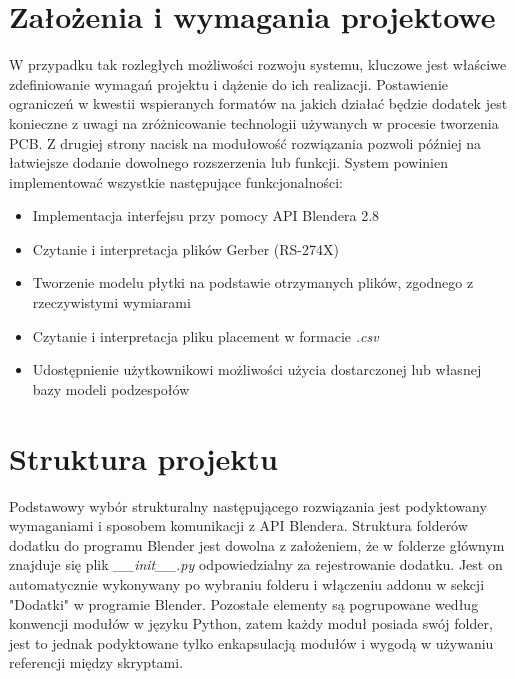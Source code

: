 \documentclass{xmgr}
\begin{document}
\section{Założenia i wymagania projektowe}
W przypadku tak rozległych możliwości rozwoju systemu, kluczowe jest właściwe zdefiniowanie wymagań projektu i dążenie do ich realizacji. Postawienie ograniczeń w kwestii wspieranych formatów na jakich działać będzie dodatek jest konieczne z uwagi na zróżnicowanie technologii używanych w procesie tworzenia PCB. Z drugiej strony nacisk na modułowość rozwiązania pozwoli później na łatwiejsze dodanie dowolnego rozszerzenia lub funkcji.
System powinien implementować wszystkie następujące funkcjonalności:

\begin{itemize}

\item Implementacja interfejsu przy pomocy API Blendera 2.8

\item Czytanie i interpretacja plików Gerber (RS-274X)

\item Tworzenie modelu płytki na podstawie otrzymanych plików, zgodnego z rzeczywistymi wymiarami

\item Czytanie i interpretacja pliku placement w formacie \emph{.csv}

\item Udostępnienie użytkownikowi możliwości użycia dostarczonej lub własnej bazy modeli podzespołów

\end{itemize}

\section {Struktura projektu}
Podstawowy wybór strukturalny następującego rozwiązania jest podyktowany wymaganiami i sposobem komunikacji z API Blendera. Struktura folderów dodatku do programu Blender jest dowolna z założeniem, że w folderze głównym znajduje się plik \emph{\_\_init\_\_.py} odpowiedzialny za rejestrowanie dodatku. Jest on automatycznie wykonywany po wybraniu folderu i włączeniu addonu w sekcji "Dodatki" w programie Blender. Pozostałe elementy są pogrupowane według konwencji modułów w języku Python, zatem każdy moduł posiada swój folder, jest to jednak podyktowane tylko enkapsulacją modułów i wygodą w używaniu referencji między skryptami.
\end{document}
